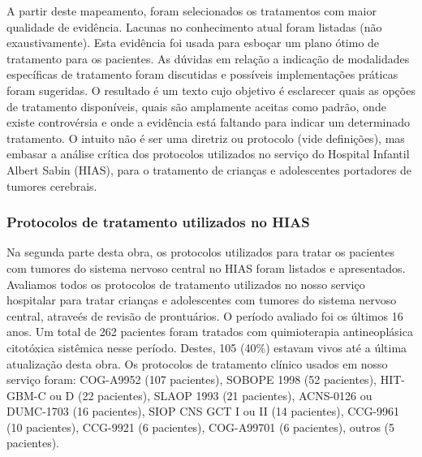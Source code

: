 \documentclass[graybox]{svmult}
\begin{document}
A partir deste mapeamento, foram selecionados os tratamentos com maior qualidade de evidência. Lacunas no conhecimento atual foram listadas (não exaustivamente). Esta evidência foi usada para esboçar um plano ótimo de tratamento para os pacientes. As dúvidas em relação a indicação de modalidades específicas de tratamento foram discutidas e possíveis implementações práticas foram sugeridas. O resultado é um texto cujo objetivo é esclarecer quais as opções de tratamento disponíveis, quais são amplamente aceitas como padrão, onde existe controvérsia e onde a evidência está faltando para indicar um determinado tratamento. O intuito não é ser uma diretriz ou protocolo (vide definições), mas embasar a análise crítica dos protocolos utilizados no serviço do Hospital Infantil Albert Sabin (HIAS), para o tratamento de crianças e adolescentes portadores de tumores cerebrais.

\subsubsection{Protocolos de tratamento utilizados no HIAS}
Na segunda parte desta obra, os protocolos utilizados para tratar os pacientes com tumores do sistema nervoso central no HIAS foram listados e apresentados. Avaliamos todos os protocolos de tratamento utilizados no nosso serviço hospitalar para tratar crianças e adolescentes com tumores do sistema nervoso central, atraveés de revisão de prontuários. O período avaliado foi os últimos 16 anos. Um total de 262 pacientes foram tratados com quimioterapia antineoplásica citotóxica sistêmica nesse período. Destes, 105 (40\%) estavam vivos até a última atualização desta obra. Os protocolos de tratamento clínico usados em nosso serviço foram: COG-A9952 \cite{Ater20072012} (107 pacientes), SOBOPE 1998 (52 pacientes), HIT-GBM-C ou D \cite{Wolff2011} (22 pacientes), SLAOP 1993 \cite{slaop1} (21 pacientes), ACNS-0126 \cite{noq191} ou DUMC-1703 (16 pacientes), SIOP CNS GCT I ou II (14 pacientes), CCG-9961 \cite{4980} (10 pacientes), CCG-9921 \cite{095} (6 pacientes), COG-A99701 \cite{2792} (6 pacientes), outros (5 pacientes). 
\end{document}
